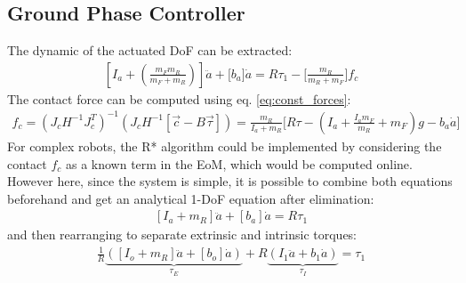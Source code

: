 \subsection{Ground Phase Controller}

The dynamic of the actuated DoF can be extracted:
%
\begin{align}
\left[ I_a + \left( \frac{m_F m_R}{m_F + m_R} \right) \right] \ddot{a} + \Bigg[ b_a \Bigg] \dot{a} = R \tau_1 - \Bigg[ \frac{m_R}{m_R+m_F} \Bigg] f_c
\end{align}
%
The contact force can be computed using eq. \eqref{eq:const_forces}:
%
\begin{align}
f_c = \left( J_c H^{-1} J_c^T \right)^{-1} \left(  J_c H^{-1} [\vec{c} - B \vec{\tau} ]  \right)
= \frac{m_R}{I_a+m_R} \Bigg[ R \tau - \left(I_a + \frac{I_a m_F}{m_R} + m_F \right) g - b_a \dot{a} \Bigg]
\end{align}
%
For complex robots, the R* algorithm could be implemented by considering the contact $f_c$ as a known term in the EoM, which would be computed online. However here, since the system is simple, it is possible to combine both equations beforehand and get an analytical 1-DoF equation after elimination:
%
\begin{align}
\left[ I_a + m_R \right] \ddot{a} + \left[ b_a \right] \dot{a} = R \tau_1 
\end{align}
%
and then rearranging to separate extrinsic and intrinsic torques:
%
\begin{align} 
\frac{1}{R}
\underbrace{\left(
\left[ I_o + m_R \right] \ddot{a} + \left[ b_o \right] \dot{a}
\right)}_{\tau_E}
+ R
\underbrace{\left(
 I_1 \ddot{a} + b_1 \dot{a}
\right)}_{\tau_I}
= \tau_1
\end{align}
%




